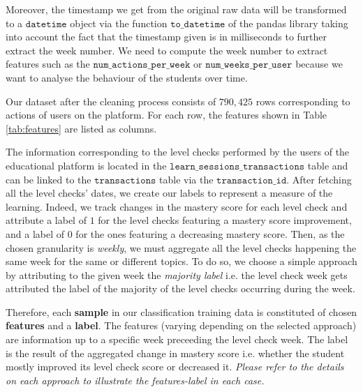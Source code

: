 \documentclass[sigplan,screen]{acmart}
\begin{document}
Moreover, the timestamp we get from the original raw data will be transformed to a $\texttt{datetime}$ object via the function $\texttt{to\_datetime}$ of the pandas library taking into account the fact that the timestamp given is in milliseconds to further extract the week number. We need to compute the week number to extract features such as the $\texttt{num\_actions\_per\_week}$ or $\texttt{num\_weeks\_per\_user}$ because we want to analyse the behaviour of the students over time.


Our dataset after the cleaning process consists of $790,425$ rows corresponding to actions of users on the platform. For each row, the features shown in Table \ref{tab:features} are listed as columns.

The information corresponding to the level checks performed by the users of the educational platform is located in the $\texttt{learn\_sessions\_transactions}$ table and can be linked to the $\texttt{transactions}$ table via the $\texttt{transaction\_id}$. After fetching all the level checks' dates, we create our labels to represent a measure of the learning. Indeed, we track changes in the mastery score for each level check and attribute a label of $1$ for the level checks featuring a mastery score improvement, and a label of $0$ for the ones featuring a decreasing mastery score. Then, as the chosen granularity is \textit{weekly}, we must aggregate all the level checks happening the same week for the same or different topics. To do so, we choose a simple approach by attributing to the given week the \textit{majority label} i.e. the level check week gets attributed the label of the majority of the level checks occurring during the week.

Therefore, each \textbf{sample} in our classification training data is constituted of chosen \textbf{features} and a \textbf{label}. The features (varying depending on the selected approach) are information up to a specific week preceeding the level check week. The label is the result of the aggregated change in mastery score i.e. whether the student mostly improved its level check score or decreased it. \textit{Please refer to the details on each approach to illustrate the features-label in each case.}
\end{document}
